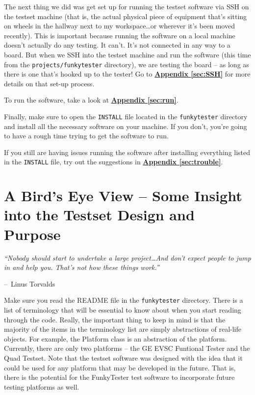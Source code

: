 \documentclass{report}
\makeatletter
\newenvironment{chapquote}[2][2em]
  {\setlength{\@tempdima}{#1}%
   \def\chapquote@author{#2}%
   \parshape 1 \@tempdima \dimexpr\textwidth-2\@tempdima\relax%
   \itshape}
  {\par\normalfont\hfill--\ \chapquote@author\hspace*{\@tempdima}\par\bigskip}
\makeatother
\begin{document}
The next thing we did was get set up for running the testset software via SSH on the testset machine (that is, the actual physical piece of equipment that's sitting on wheels in the hallway next to my workspace\ldots or wherever it's been moved recently). This is important because running the software on a local machine doesn't actually do any testing. It can't. It's not connected in any way to a board. But when we SSH into the testset machine and run the software (this time from the \texttt{projects/funkytester} directory), we are testing the board -- as long as there is one that's hooked up to the tester! Go to \hyperref[sec:SSH]{\textbf{Appendix \ref{sec:SSH}}} for more details on that set-up process.

To run the software, take a look at \hyperref[sec:run]{\textbf{Appendix \ref{sec:run}}}.

Finally, make sure to open the \texttt{INSTALL} file located in the \texttt{funkytester} directory and install all the necessary software on your machine. If you don't, you're going to have a rough time trying to get the software to run. 

If you still are having issues running the software after installing everything listed in the \texttt{INSTALL} file, try out the suggestions in \hyperref[sec:trouble]{\textbf{Appendix \ref{sec:trouble}}}.

\section{A Bird's Eye View -- Some Insight into the Testset Design and Purpose}
\begin{chapquote}{Linus Torvalds}
``Nobody should start to undertake a large project\ldots And don't expect people to jump in and help you. That's not how these things work.''
\end{chapquote}

Make sure you read the README file in the \texttt{funkytester} directory. There is a list of terminology that will be essential to know about when you start reading through the code. Really, the important thing to keep in mind is that the majority of the items in the terminology list are simply abstractions of real-life objects. For example, the Platform class is an abstraction of the platform. Currently, there are only two platforms -- the GE EVSC Funtional Tester and the Quad Testset. Note that the testset software was designed with the idea that it could be used for any platform that may be developed in the future. That is, there is the potential for the FunkyTester test software to incorporate future testing platforms as well.
\end{document}
